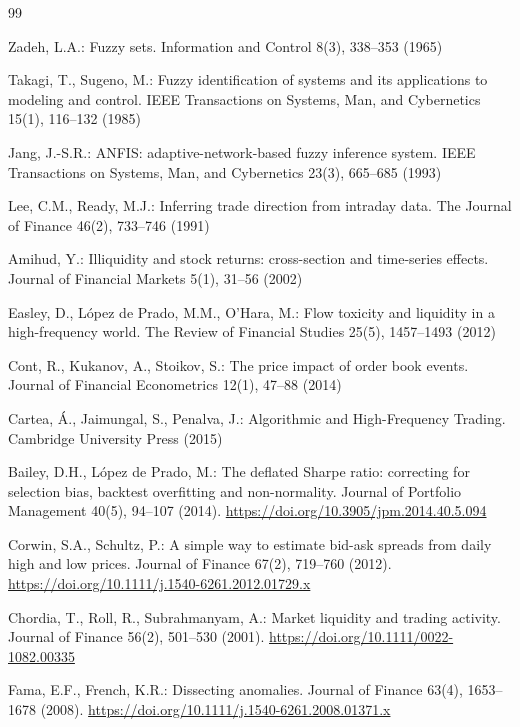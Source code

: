 \documentclass[pdflatex,sn-mathphys-num]{sn-jnl}
\theoremstyle{thmstyleone}
\theoremstyle{thmstyletwo}
\theoremstyle{thmstylethree}
\begin{document}
\begin{thebibliography}{99}

Zadeh, L.A.: Fuzzy sets. Information and Control 8(3), 338--353 (1965)

Takagi, T., Sugeno, M.: Fuzzy identification of systems and its applications to modeling and control. IEEE Transactions on Systems, Man, and Cybernetics 15(1), 116--132 (1985)

Jang, J.-S.R.: ANFIS: adaptive-network-based fuzzy inference system. IEEE Transactions on Systems, Man, and Cybernetics 23(3), 665--685 (1993)

Lee, C.M., Ready, M.J.: Inferring trade direction from intraday data. The Journal of Finance 46(2), 733--746 (1991)

Amihud, Y.: Illiquidity and stock returns: cross-section and time-series effects. Journal of Financial Markets 5(1), 31--56 (2002)

Easley, D., López de Prado, M.M., O'Hara, M.: Flow toxicity and liquidity in a high-frequency world. The Review of Financial Studies 25(5), 1457--1493 (2012)

Cont, R., Kukanov, A., Stoikov, S.: The price impact of order book events. Journal of Financial Econometrics 12(1), 47--88 (2014)

Cartea, Á., Jaimungal, S., Penalva, J.: Algorithmic and High-Frequency Trading. Cambridge University Press (2015)

Bailey, D.H., L\'opez de Prado, M.: The deflated Sharpe ratio: correcting for selection bias, backtest overfitting and non-normality. Journal of Portfolio Management 40(5), 94--107 (2014). \url{https://doi.org/10.3905/jpm.2014.40.5.094}

Corwin, S.A., Schultz, P.: A simple way to estimate bid-ask spreads from daily high and low prices. Journal of Finance 67(2), 719--760 (2012). \url{https://doi.org/10.1111/j.1540-6261.2012.01729.x}

Chordia, T., Roll, R., Subrahmanyam, A.: Market liquidity and trading activity. Journal of Finance 56(2), 501--530 (2001). \url{https://doi.org/10.1111/0022-1082.00335}

Fama, E.F., French, K.R.: Dissecting anomalies. Journal of Finance 63(4), 1653--1678 (2008). \url{https://doi.org/10.1111/j.1540-6261.2008.01371.x}


\end{thebibliography}
\end{document}
